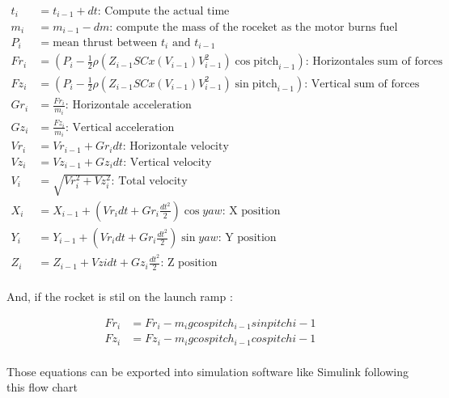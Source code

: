 \begin{align*}
    t_i  & = t_{i-1} + dt \text{: Compute the actual time}                                                                      \\
    m_i  & = m_{i-1} - dm \text{: compute the mass of the roceket as the motor burns fuel}                                      \\
    P_i  & = \text{mean thrust between $t_i$ and $t_{i-1}$}                                                                     \\
    Fr_i & = (P_i - \frac{1}{2}\rho(Z_{i-1}SCx(V_{i-1})V^2_{i-1}) \cos{\text{pitch}_{i-1}}) \text{: Horizontales sum of forces} \\
    Fz_i & = (P_i - \frac{1}{2}\rho(Z_{i-1}SCx(V_{i-1})V^2_{i-1}) \sin{\text{pitch}_{i-1}}) \text{: Vertical sum of forces}     \\
    Gr_i & = \frac{Fr_i}{m_i} \text{: Horizontale acceleration}                                                                 \\
    Gz_i & = \frac{Fz_i}{m_i} \text{: Vertical acceleration}                                                                    \\
    Vr_i & = Vr_{i-1} + Gr_i dt \text{: Horizontale velocity}                                                                   \\
    Vz_i & = Vz_{i-1} + Gz_i dt \text{: Vertical velocity}                                                                      \\
    V_i  & = \sqrt{Vr_i^2 + Vz_i^2} \text{: Total velocity}                                                                     \\
    X_i  & = X_{i-1} + (Vr_i dt + Gr_i \frac{dt^2}{2}) \cos{yaw} \text{: X position}                                            \\
    Y_i  & = Y_{i-1} + (Vr_i dt + Gr_i \frac{dt^2}{2}) \sin{yaw} \text{: Y position}                                            \\
    Z_i  & = Z_{i-1} + Vzi dt + Gz_i \frac{dt^2}{2} \text{: Z position}                                                         \\
\end{align*}

And, if the rocket is stil on the launch ramp :

\begin{align*}
    Fr_i & = Fr_i - m_i g cos{pitch_{i-1}} sin {pitch{i-1}} \\
    Fz_i & = Fz_i - m_i g cos{pitch_{i-1}} cos {pitch{i-1}} \\
\end{align*}

Those equations can be exported into simulation software like Simulink
following this flow chart

